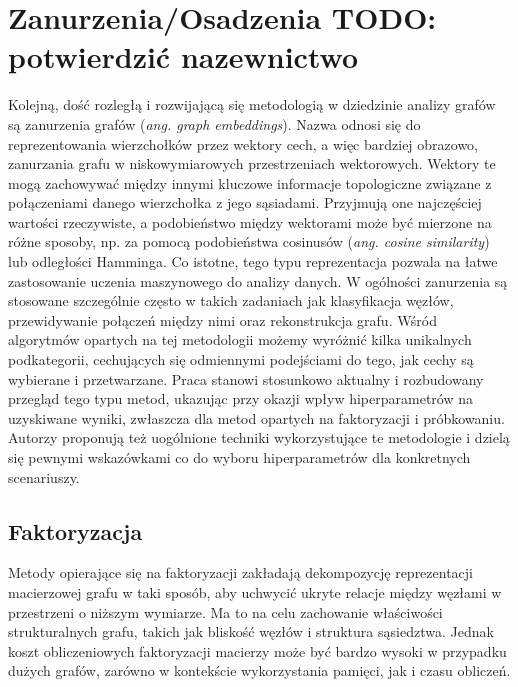 \section{Zanurzenia/Osadzenia TODO: potwierdzić nazewnictwo}
    Kolejną, dość rozległą i rozwijającą się metodologią w dziedzinie analizy grafów są zanurzenia grafów (\emph{ang. graph embeddings}). Nazwa odnosi się do reprezentowania wierzchołków przez wektory cech, a więc bardziej obrazowo, zanurzania grafu w niskowymiarowych przestrzeniach wektorowych. Wektory te mogą zachowywać między innymi kluczowe informacje topologiczne związane z połączeniami danego wierzchołka z jego sąsiadami. Przyjmują one najczęściej wartości rzeczywiste, a podobieństwo między wektorami może być mierzone na różne sposoby, np.  za pomocą podobieństwa cosinusów (\emph{ang. cosine similarity}) lub odległości Hamminga\cite{Lian_Zheng_Zheng_Ge_Cao_Tsang_Xie_2018}. Co istotne, tego typu reprezentacja pozwala na łatwe zastosowanie uczenia maszynowego do analizy danych. W ogólności zanurzenia są stosowane szczególnie często w takich zadaniach jak klasyfikacja węzłów, przewidywanie połączeń między nimi oraz rekonstrukcja grafu. Wśród algorytmów opartych na tej metodologii możemy wyróżnić kilka unikalnych podkategorii, cechujących się odmiennymi podejściami do tego, jak cechy są wybierane i przetwarzane. Praca \cite{Yang_Qu_Hussein_Rosso_Cudré-Mauroux_Liu_2023} stanowi stosunkowo aktualny i rozbudowany przegląd tego typu metod, ukazując przy okazji wpływ hiperparametrów na uzyskiwane wyniki, zwłaszcza dla metod opartych na faktoryzacji i próbkowaniu. Autorzy proponują też uogólnione techniki wykorzystujące te metodologie i dzielą się pewnymi wskazówkami co do wyboru hiperparametrów dla konkretnych scenariuszy. 

    \subsection{Faktoryzacja}
        Metody opierające się na faktoryzacji zakładają dekompozycję reprezentacji macierzowej grafu w taki sposób, aby uchwycić ukryte relacje między węzłami w przestrzeni o niższym wymiarze. Ma to na celu zachowanie właściwości strukturalnych grafu, takich jak bliskość węzłów i struktura sąsiedztwa. Jednak koszt obliczeniowych faktoryzacji macierzy może być bardzo wysoki w przypadku dużych grafów, zarówno w kontekście wykorzystania pamięci, jak i czasu obliczeń.

